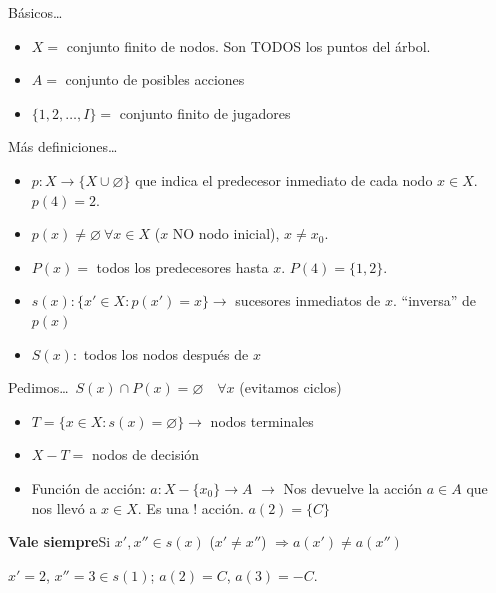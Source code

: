 \documentclass[11pt,a4paper]{article}
\newenvironment{apuntebox}[1]{\begin{tcolorbox}[colback=palered,colframe=inkred,boxrule=.7pt,arc=0mm,left=.8em,right=.8em,top=.45em,bottom=.45em]\textcolor{inkred}{\textbf{#1}}\quad}{\end{tcolorbox}}
\newcommand{\rojo}[1]{\textcolor{inkred}{#1}}
\newcommand{\gris}[1]{\textcolor{pencilgray}{#1}}
\begin{document}
Básicos\ldots
\begin{itemize}\item $X=$ conjunto finito de nodos. Son TODOS los puntos del árbol.
\item $A=$ conjunto de posibles acciones
\item $\{1,2,\ldots,I\}=$ conjunto finito de jugadores\end{itemize}
\begin{center}\end{center}
Más definiciones\ldots
\begin{itemize}\item $p:X\to\{X\cup\varnothing\}$ que indica el predecesor inmediato de cada nodo $x\in X$.
\gris{$p(4)=2$.}
\item $p(x)\ne\varnothing\ \forall x\in X$ \gris{($x$ NO nodo inicial)}, $x\ne x_0$.
\item $P(x)=$ todos los predecesores hasta $x$. \gris{$P(4)=\{1,2\}$.}
\item $s(x):\{x'\in X:p(x')=x\}\to$ sucesores inmediatos de $x$. \gris{``inversa'' de $p(x)$}
\item $S(x):$ todos los nodos después de $x$\end{itemize}
Pedimos\ldots\ $S(x)\cap P(x)=\varnothing\quad\forall x$ \gris{(evitamos ciclos)}
\begin{itemize}\item $T=\{x\in X:s(x)=\varnothing\}\to$ nodos terminales
\item $X-T=$ nodos de decisión
\item Función de acción: $a:X-\{x_0\}\to A$
\rojo{$\to$ Nos devuelve la acción $a\in A$ que nos llevó a $x\in X$}. Es una ! acción. \gris{$a(2)=\{C\}$}
\end{itemize}
\begin{apuntebox}{Vale siempre}Si $x',x''\in s(x)$ ($x'\ne x''$) $\Rightarrow a(x')\ne a(x'')$\end{apuntebox}
\begin{center}\end{center}\gris{$x'=2$, $x''=3\in s(1)$; $a(2)=C$, $a(3)=-C$.}
\end{document}
